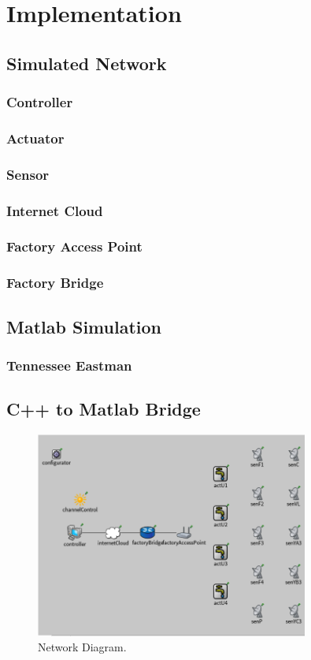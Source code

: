 \section{Implementation}
\subsection{Simulated Network}

\subsubsection{Controller}

\subsubsection{Actuator}

\subsubsection{Sensor}

\subsubsection{Internet Cloud}

\subsubsection{Factory Access Point}

\subsubsection{Factory Bridge}

\subsection{Matlab Simulation}

\subsubsection{Tennessee Eastman}

\subsection{C++ to Matlab Bridge}

\begin{figure}
        \centering
		\includegraphics[width=0.8\textwidth]{figs/network.png}
        \caption{Network Diagram.}
        \label{fig:system}        
\end{figure}